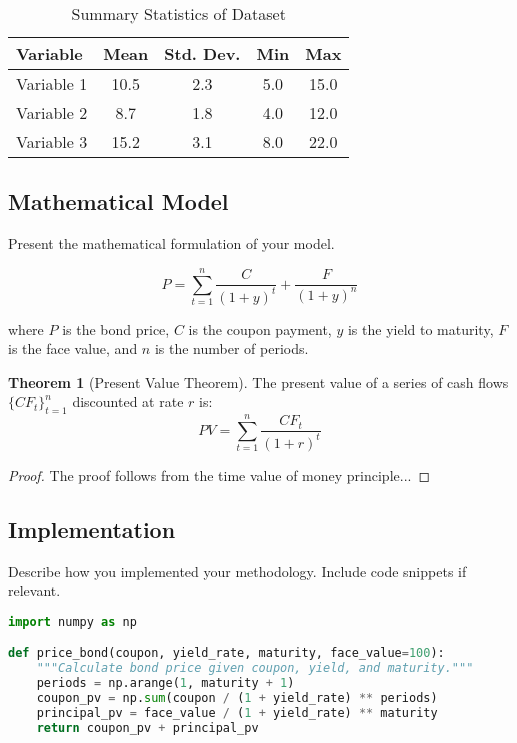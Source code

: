 \documentclass[12pt,a4paper]{article}
\theoremstyle{definition}
\newtheorem{theorem}{Theorem}[section]
\begin{document}
\begin{table}[H]
\centering
\caption{Summary Statistics of Dataset}
\label{tab:summary_stats}
\begin{tabular}{@{}lcccc@{}}
\toprule
Variable & Mean & Std. Dev. & Min & Max \\
\midrule
Variable 1 & 10.5 & 2.3 & 5.0 & 15.0 \\
Variable 2 & 8.7 & 1.8 & 4.0 & 12.0 \\
Variable 3 & 15.2 & 3.1 & 8.0 & 22.0 \\
\bottomrule
\end{tabular}
\end{table}

\subsection{Mathematical Model}
\label{subsec:model}

Present the mathematical formulation of your model.

\begin{equation}
\label{eq:bond_price}
P = \sum_{t=1}^{n} \frac{C}{(1+y)^t} + \frac{F}{(1+y)^n}
\end{equation}

where $P$ is the bond price, $C$ is the coupon payment, $y$ is the yield to maturity,
$F$ is the face value, and $n$ is the number of periods.

\begin{theorem}[Present Value Theorem]
\label{thm:pv}
The present value of a series of cash flows $\{CF_t\}_{t=1}^{n}$ discounted at rate $r$ is:
\begin{equation}
PV = \sum_{t=1}^{n} \frac{CF_t}{(1+r)^t}
\end{equation}
\end{theorem}

\begin{proof}
The proof follows from the time value of money principle...
\end{proof}

\subsection{Implementation}
\label{subsec:implementation}

Describe how you implemented your methodology. Include code snippets if relevant.

\begin{lstlisting}[language=Python, caption=Bond Pricing Implementation, label=lst:bond_price]
import numpy as np

def price_bond(coupon, yield_rate, maturity, face_value=100):
    """Calculate bond price given coupon, yield, and maturity."""
    periods = np.arange(1, maturity + 1)
    coupon_pv = np.sum(coupon / (1 + yield_rate) ** periods)
    principal_pv = face_value / (1 + yield_rate) ** maturity
    return coupon_pv + principal_pv
\end{lstlisting}
\end{document}
